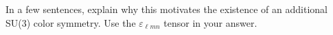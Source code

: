 \documentclass[12pt]{article}
\begin{document}
In a few sentences, explain why this motivates the existence of an additional SU(3) color symmetry. Use the $\varepsilon_{\ell m n}$ tensor in your answer.



%
%
%
%
%
%
%
%
%
\end{document}
